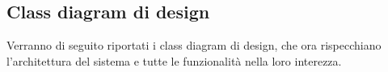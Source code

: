 \subsection{Class diagram di design}
\begin{flushleft}
    Verranno di seguito riportati i class diagram di design, che ora rispecchiano l'architettura del sistema e tutte le funzionalità nella loro
    interezza.
\end{flushleft}
